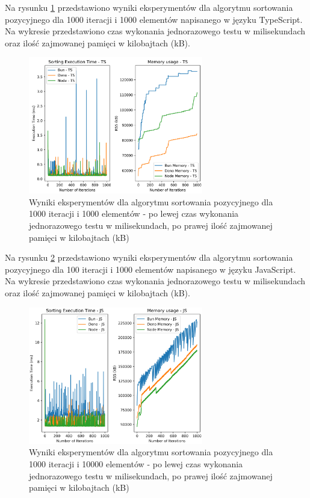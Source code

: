 Na rysunku \ref{fig:radix_sorting_e3_ts} przedstawiono wyniki eksperymentów dla algorytmu sortowania pozycyjnego dla 1000 iteracji i 1000 elementów napisanego w języku TypeScript. Na wykresie przedstawiono czas wykonania jednorazowego testu w milisekundach oraz ilość zajmowanej pamięci w kilobajtach (kB).

\begin{figure}[H]
  \centering
  \includegraphics[width=0.68\textwidth]{Figures/sorting/sorting_radix_1000_1000_ts.png}
  \caption{Wyniki eksperymentów dla algorytmu sortowania pozycyjnego dla 1000 iteracji i 1000 elementów - po lewej czas wykonania jednorazowego testu w milisekundach, po prawej ilość zajmowanej pamięci w kilobajtach (kB)}
  \label{fig:radix_sorting_e3_ts}
\end{figure}

Na rysunku \ref{fig:radix_sorting_e4} przedstawiono wyniki eksperymentów dla algorytmu sortowania pozycyjnego dla 100 iteracji i 1000 elementów napisanego w języku JavaScript. Na wykresie przedstawiono czas wykonania jednorazowego testu w milisekundach oraz ilość zajmowanej pamięci w kilobajtach (kB).

\begin{figure}[H]
  \centering
  \includegraphics[width=0.68\textwidth]{Figures/sorting/sorting_radix_1000_10000_js.png}
  \caption{Wyniki eksperymentów dla algorytmu sortowania pozycyjnego dla 1000 iteracji i 10000 elementów - po lewej czas wykonania jednorazowego testu w milisekundach, po prawej ilość zajmowanej pamięci w kilobajtach (kB)}
  \label{fig:radix_sorting_e4}
\end{figure}

